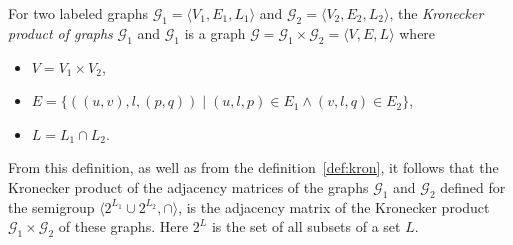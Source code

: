 \begin{definition}
	For two labeled graphs $\mathcal{G}_1=\langle V_1, E_1, L_1 \rangle$ and $\mathcal{G}_2=\langle V_2, E_2, L_2 \rangle$, the \textit{Kronecker product of graphs} $\mathcal{G}_1$ and $\mathcal{G}_1$ is a graph $\mathcal{G} = \mathcal{G}_1 \times \mathcal{G}_2 = \langle V, E, L \rangle$ where
	\begin{itemize}
	    \item $V = V_1 \times V_2$,
	    \item $E = \{((u, v), l, (p, q)) \mid (u, l, p) \in E_1 \wedge (v, l, q) \in E_2\}$,
	    \item $L = L_1 \cap L_2$.
	\end{itemize}
\end{definition}

From this definition, as well as from the definition~\ref{def:kron}, it follows that the Kronecker product of the adjacency matrices of the graphs $\mathcal{G}_1$ and $\mathcal{G}_2$ defined for the semigroup $\langle 2^{L_1} \cup 2^{L_2}, \cap \rangle$, is the adjacency matrix of the Kronecker product $\mathcal{G}_1 \times \mathcal{G}_2$ of these graphs. Here $2^L$ is the set of all subsets of a set $L$.

